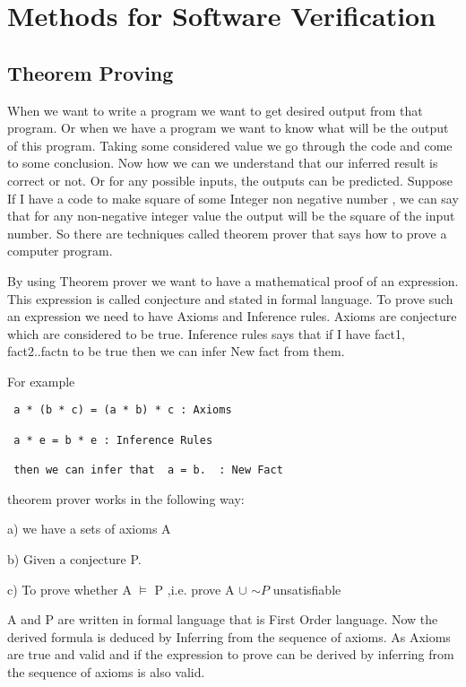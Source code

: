 \section{Methods for Software Verification}

\subsection{Theorem Proving}

When we want to write a program we want to get desired
output from that program. Or when we have a program we want to know what will be 
the output of this program. Taking some considered value we go through the code
and come to some conclusion. Now how we can we understand that our inferred result
is correct or not. Or for any possible inputs, the outputs can be predicted.
Suppose If I have a code to make square of some Integer non negative number ,
we can say that for any non-negative integer value the output will be the 
square of the input number. So there are techniques called theorem prover
that says how to prove a computer program.


By using Theorem prover we want to have 
a mathematical proof of  an expression. This expression is called 
conjecture and stated in formal language. To prove such an 
expression we need to have Axioms and Inference rules. Axioms are
conjecture which are considered to be true. Inference rules says that if I have
fact1, fact2..factn to be true then we can infer New fact from them.

For example

\begin{verbatim}
 a * (b * c) = (a * b) * c : Axioms
 
 a * e = b * e : Inference Rules
 
 then we can infer that  a = b.  : New Fact
\end{verbatim}

theorem prover works in the following way:

a) we have a sets of axioms A

b) Given a conjecture P.

c) To prove whether A $\models$ P ,i.e. prove A $\cup$ ${\sim P}$ unsatisfiable

A and P are written in formal language that is First Order language. Now the 
derived formula is deduced by Inferring from the sequence of axioms. 
As Axioms are true and valid and if the expression to prove can be 
derived by inferring from the sequence of axioms is also valid.

